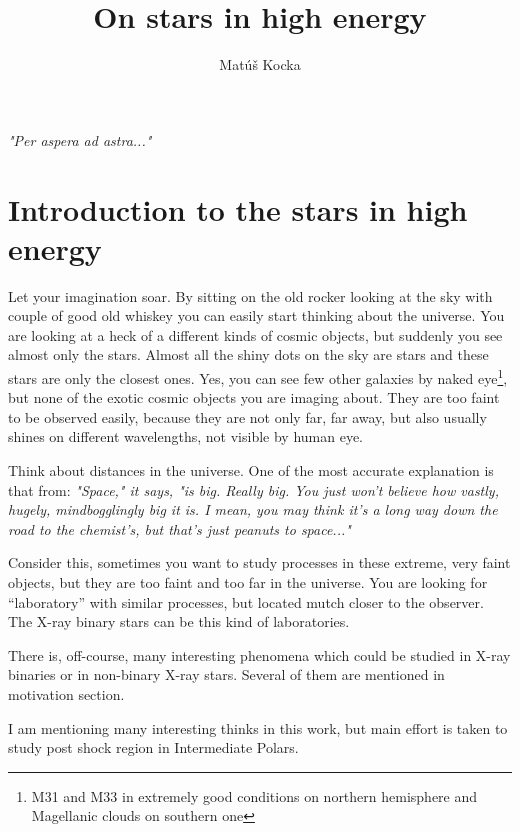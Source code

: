 \documentclass[oneside,a4paper,11pt]{report}
\title{On stars in high energy }
\author{Matúš Kocka}
\begin{document}

\fancyhf{}
\newpage
\textit{"Per aspera ad astra..."}

\pagebreak
\tableofcontents

\chapter{Introduction to the stars in high energy }

Let your imagination soar. 
By sitting on the old rocker looking at the sky with couple of good old whiskey you can easily 
start thinking about the universe. You are looking at a heck of a different kinds of cosmic 
objects, but suddenly you see almost only the stars. Almost all the shiny dots on the sky are 
stars and these stars are only the closest ones. Yes, you can see few other 
galaxies by naked eye\footnote{M31 and M33 in extremely good conditions on northern hemisphere
and Magellanic clouds on southern one}, but none of the exotic cosmic objects you are imaging about. 
They are too faint to be observed easily, because they are not only far, far away, but also usually shines 
on different wavelengths, not visible by human eye.

Think about distances in the universe. One of the most accurate explanation is that from: \cite{hitch:1}  
\textit{"Space," it says, "is big. Really big. You just won't believe how vastly, 
hugely, mindbogglingly big it is. I mean, you may think it's a long way down the road to the 
chemist's, but that's just peanuts to space..."} 

Consider this, sometimes you want to study processes in these extreme, very faint objects, 
but they are too faint and too far in the universe. You are looking for “laboratory” with similar
 processes, but located mutch closer to the observer. The X-ray binary stars can be this kind 
of laboratories.  

There is, off-course, many interesting phenomena which could be studied in X-ray binaries or in non-binary X-ray stars. 
Several of them are mentioned in motivation section. 

I am mentioning many interesting thinks in this work, but main effort is taken to 
study post shock region in Intermediate Polars.   
\end{document}
